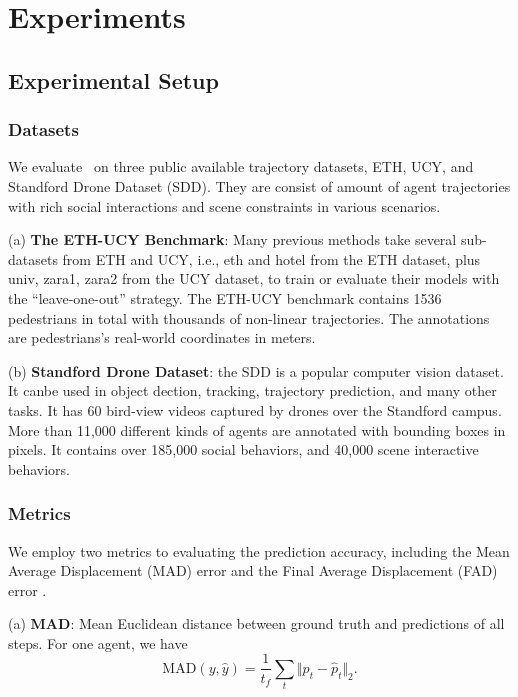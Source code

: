 \documentclass[../paper.tex]{subfiles}
\begin{document}
    
\section{Experiments}

\subsection{Experimental Setup}

\subsubsection{Datasets}
We evaluate \MODEL~on three public available trajectory datasets, ETH\cite{youWillNeverWalkAlone}, UCY\cite{2007Crowds}, and Standford Drone Dataset (SDD)\cite{learningSocialEtiquette}.
They are consist of amount of agent trajectories with rich social interactions and scene constraints in various scenarios.

(a) \textbf{The ETH-UCY Benchmark}:
Many previous methods \cite{socialLSTM,socialGAN,sophie} take several sub-datasets from ETH and UCY, i.e., eth and hotel from the ETH dataset, plus univ, zara1, zara2 from the UCY dataset, to train or evaluate their models with the ``leave-one-out'' strategy.
The ETH-UCY benchmark contains 1536 pedestrians in total with thousands of non-linear trajectories.
The annotations are pedestrians's real-world coordinates in meters.

(b) \textbf{Standford Drone Dataset}:
the SDD\cite{learningSocialEtiquette} is a popular computer vision dataset.
It canbe used in object dection, tracking, trajectory prediction, and many other tasks.
It has 60 bird-view videos captured by drones over the Standford campus.
More than 11,000 different kinds of agents are annotated with bounding boxes in pixels.
It contains over 185,000 social behaviors, and 40,000 scene interactive behaviors.


\subsubsection{Metrics}
We employ two metrics to evaluating the prediction accuracy, including the Mean Average Displacement (MAD) error and the Final Average Displacement (FAD) error \cite{youWillNeverWalkAlone}.

(a) \textbf{MAD}:
Mean Euclidean distance between ground truth and predictions of all steps.
For one agent, we have
\begin{equation}
    \mbox{MAD}(y, \hat{y}) = \frac{1}{t_f} \sum_{t} \Vert p_t - \hat{p}_t \Vert_2.
\end{equation}
\end{document}
